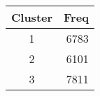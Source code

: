 
\begin{tabular}[t]{cr}
\toprule
Cluster & Freq\\
\midrule
1 & 6783\\
2 & 6101\\
3 & 7811\\
\bottomrule
\end{tabular}